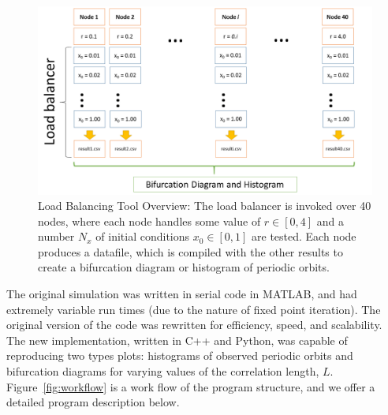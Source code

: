 \begin{figure}[htp]
\caption[Load balancing tool overview]{Load Balancing Tool Overview:
  The load balancer is invoked over 40 nodes, where each node handles
  some value of $r \in [0,4]$ and a number $N_x$ of initial conditions
  $x_0 \in [0,1]$ are tested. Each node produces a datafile, which is
  compiled with the other results to create a bifurcation diagram or
  histogram of periodic orbits.}\label{fig:lbtool}
	\begin{center}
          \includegraphics[scale=0.45]{figs/load_balancer.png}
	\end{center}
\end{figure}

The original simulation was written in serial code in
MATLAB, and had extremely variable run times (due to the nature of fixed
point iteration). The original version of the code was rewritten for efficiency,
speed, and scalability. The new implementation, written in C++ and
Python, was capable of reproducing two types plots: histograms of observed periodic
orbits and bifurcation diagrams for varying values of the correlation
length, $L$. Figure~\ref{fig:workflow} is a work flow of the
program structure, and we offer a detailed program description below.

